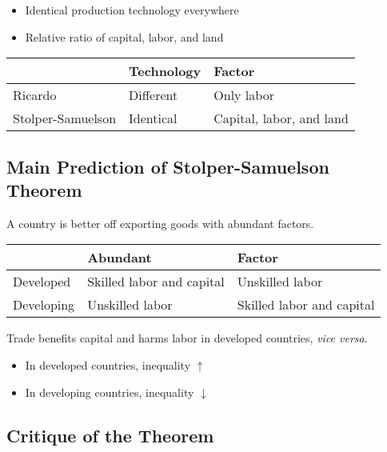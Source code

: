 \documentclass[
]{book}
\begin{document}
\begin{itemize}
\item
  Identical production technology everywhere
\item
  Relative ratio of capital, labor, and land
\end{itemize}

\begin{tabu} to 
\hline
  & Technology & Factor\\
\hline
Ricardo & Different & Only labor\\
\hline
Stolper-Samuelson & Identical & Capital, labor, and land\\
\hline
\end{tabu}

\hypertarget{main-prediction-of-stolper-samuelson-theorem}{%
\subsection{Main Prediction of Stolper-Samuelson Theorem}\label{main-prediction-of-stolper-samuelson-theorem}}

A country is better off exporting goods with abundant factors.

\begin{tabu} to 
\hline
  & Abundant & Factor\\
\hline
Developed & Skilled labor and capital & Unskilled labor\\
\hline
Developing & Unskilled labor & Skilled labor and capital\\
\hline
\end{tabu}

Trade benefits capital and harms labor in developed countries, \emph{vice versa}.

\begin{itemize}
\item
  In developed countries, inequality \(\uparrow\)
\item
  In developing countries, inequality \(\downarrow\)
\end{itemize}

\hypertarget{critique-of-the-theorem}{%
\subsection{Critique of the Theorem}\label{critique-of-the-theorem}}
\end{document}
